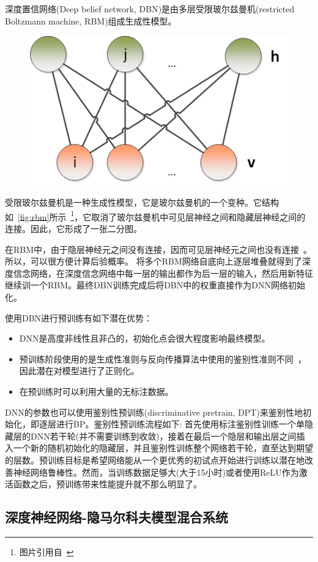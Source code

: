 深度置信网络(Deep belief network, DBN)是由多层受限玻尔兹曼机(restricted Boltzmann machine, RBM)组成生成性模型。

\begin{figure}[!htp]
  \centering
    \captionstyle{\centering}
    \includegraphics[width=.4\textwidth]{figure/RBM.png}
\end{figure}

受限玻尔兹曼机是一种生成性模型，它是玻尔兹曼机的一个变种。它结构如~\ref{fig:rbm}所示~\footnote{图片引用自~\cite{ASRBook-Yu2014}}，它取消了玻尔兹曼机中可见层神经之间和隐藏层神经之间的连接。因此，它形成了一张二分图。

在RBM中，由于隐层神经元之间没有连接，因而可见层神经元之间也没有连接~\cite{yu2010roles}。所以，可以很方便计算后验概率。
将多个RBM网络自底向上逐层堆叠就得到了深度信念网络，在深度信念网络中每一层的输出都作为后一层的输入，然后用新特征继续训一个RBM。最终DBN训练完成后将DBN中的权重直接作为DNN网络初始化。

使用DBN进行预训练有如下潜在优势：
\begin{itemize}
    \item DNN是高度非线性且非凸的，初始化点会很大程度影响最终模型。
    \item 预训练阶段使用的是生成性准则与反向传播算法中使用的鉴别性准则不同~\cite{yu2010roles}，因此潜在对模型进行了正则化。
    \item 在预训练时可以利用大量的无标注数据。
\end{itemize}

DNN的参数也可以使用鉴别性预训练(discriminative pretrain, DPT)来鉴别性地初始化，即逐层进行BP。鉴别性预训练流程如下: 首先使用标注鉴别性训练一个单隐藏层的DNN若干轮(并不需要训练到收敛)，接着在最后一个隐层和输出层之间插入一个新的随机初始化的隐藏层，并且鉴别性训练整个网络若干轮，直至达到期望的层数。预训练目标是希望网络能从一个更优秀的初试点开始进行训练以潜在地改善神经网络鲁棒性。然而，当训练数据足够大(大于15小时)或者使用ReLU作为激活函数之后，预训练带来性能提升就不那么明显了。

\subsection{深度神经网络-隐马尔科夫模型混合系统}
\label{sec:dnn_hmm}


